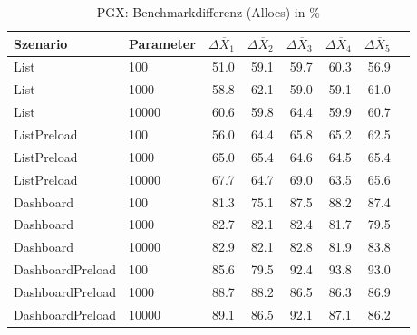 
\begin{table}[ht]
\setlength{\extrarowheight}{-1pt}
\centering
\caption{PGX: Benchmarkdifferenz (Allocs) in \%}
\begin{tabular}{llrrrrrr}
\toprule
Szenario & Parameter & ${\Delta \overline{X}_1}$ & ${\Delta \overline{X}_2}$ & ${\Delta \overline{X}_3}$ & ${\Delta \overline{X}_4}$ & ${\Delta \overline{X}_5}$ \\
\midrule
	List & 100 & \cellcolor{green!30}  51.0 & \cellcolor{green!26}  59.1 & \cellcolor{green!26}  59.7 & \cellcolor{green!26}  60.3 & \cellcolor{green!27}  56.9 \\
	List & 1000 & \cellcolor{green!26}  58.8 & \cellcolor{green!25}  62.1 & \cellcolor{green!26}  59.0 & \cellcolor{green!26}  59.1 & \cellcolor{green!26}  61.0 \\
	List & 10000 & \cellcolor{green!26}  60.6 & \cellcolor{green!26}  59.8 & \cellcolor{green!24}  64.4 & \cellcolor{green!26}  59.9 & \cellcolor{green!26}  60.7 \\
	ListPreload & 100 & \cellcolor{green!28}  56.0 & \cellcolor{green!24}  64.4 & \cellcolor{green!24}  65.8 & \cellcolor{green!24}  65.2 & \cellcolor{green!25}  62.5 \\
	ListPreload & 1000 & \cellcolor{green!24}  65.0 & \cellcolor{green!24}  65.4 & \cellcolor{green!24}  64.6 & \cellcolor{green!24}  64.5 & \cellcolor{green!24}  65.4 \\
	ListPreload & 10000 & \cellcolor{green!23}  67.7 & \cellcolor{green!24}  64.7 & \cellcolor{green!22}  69.0 & \cellcolor{green!25}  63.5 & \cellcolor{green!24}  65.6 \\
	Dashboard & 100 & \cellcolor{green!17}  81.3 & \cellcolor{green!20}  75.1 & \cellcolor{green!15}  87.5 & \cellcolor{green!15}  88.2 & \cellcolor{green!15}  87.4 \\
	Dashboard & 1000 & \cellcolor{green!17}  82.7 & \cellcolor{green!17}  82.1 & \cellcolor{green!17}  82.4 & \cellcolor{green!17}  81.7 & \cellcolor{green!18}  79.5 \\
	Dashboard & 10000 & \cellcolor{green!17}  82.9 & \cellcolor{green!17}  82.1 & \cellcolor{green!17}  82.8 & \cellcolor{green!17}  81.9 & \cellcolor{green!16}  83.8 \\
	DashboardPreload & 100 & \cellcolor{green!16}  85.6 & \cellcolor{green!18}  79.5 & \cellcolor{green!13}  92.4 & \cellcolor{green!12}  93.8 & \cellcolor{green!13}  93.0 \\
	DashboardPreload & 1000 & \cellcolor{green!15}  88.7 & \cellcolor{green!15}  88.2 & \cellcolor{green!15}  86.5 & \cellcolor{green!15}  86.3 & \cellcolor{green!15}  86.9 \\
	DashboardPreload & 10000 & \cellcolor{green!14}  89.1 & \cellcolor{green!15}  86.5 & \cellcolor{green!13}  92.1 & \cellcolor{green!15}  87.1 & \cellcolor{green!16}  86.2 \\
\bottomrule
\end{tabular}
\label{tab:benchmarkdifferenz_pgx_allocs}
\end{table}
	